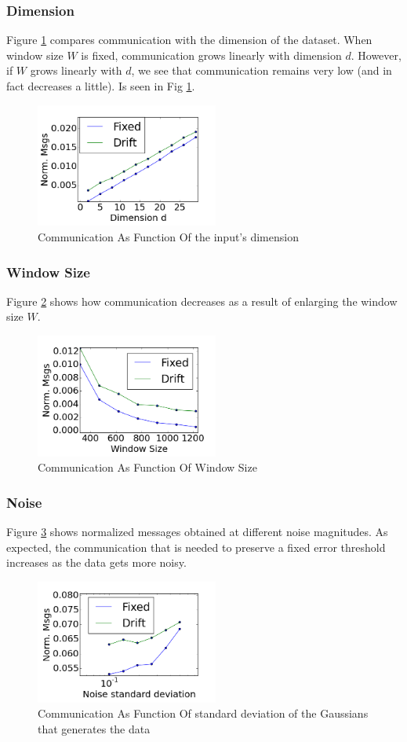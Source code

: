 \documentclass[11pt,twocolumn,varwidth=true,a4paper,fleqn]{article}
\begin{document}
\subsubsection{Dimension}
Figure \ref{Dimension} compares communication with the dimension of the dataset.
When window size $W$ is fixed, communication grows linearly with dimension $d$.
However, if $W$ grows linearly with $d$, we see that communication
remains very low (and in fact decreases a little).
Is seen in Fig \ref{Dimension}.
	\begin{figure}[h]
	\centering
	\includegraphics[width=60mm]{CommunicationOfFixedVsDrift/Dimension.png}
	\caption{Communication As Function Of the input's dimension}
	\label{Dimension}
	\end{figure}
\subsubsection{Window Size}
Figure \ref{WindowSize} shows how communication decreases as a result
of enlarging the window size $W$. 
	\begin{figure}[h]
	\centering
	\includegraphics[width=60mm]{CommunicationOfFixedVsDrift/WindowSize.png}
	\caption{Communication As Function Of Window Size}
	\label{WindowSize}
	\end{figure}
\subsubsection{Noise}
Figure \ref{Noise} shows normalized messages obtained at different
noise magnitudes. As expected, the communication that is needed to preserve a
fixed error threshold increases as the data gets more noisy.
\begin{figure}[h]
	\centering
	\includegraphics[width=60mm]{CommunicationOfFixedVsDrift/Noise.png}
	\caption{Communication As Function Of standard deviation of the Gaussians that
	generates the data}
	\label{Noise}
	\end{figure}
\end{document}
